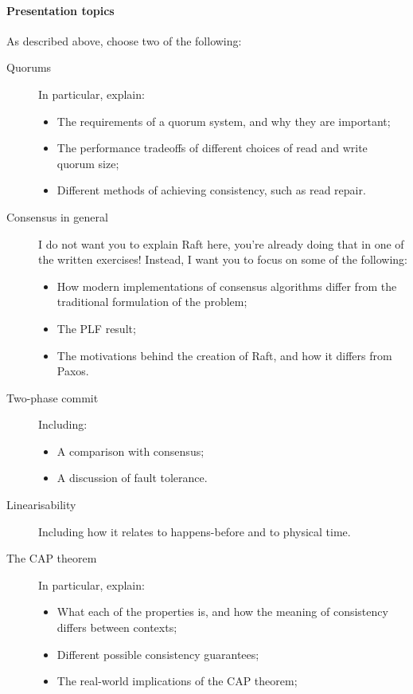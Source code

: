 \documentclass[12pt,a4paper,oneside,openright]{report}
\newcommand{\question}[2]{\paragraph{#1} #2}
\begin{document}
\question{Presentation topics}{As described above, choose two of the
  following:
  \begin{description}
  \item[Quorums] In particular, explain:
    \begin{itemize}
    \item The requirements of a quorum system, and why they are
      important;
    \item The performance tradeoffs of different choices of read and
      write quorum size;
    \item Different methods of achieving consistency, such as read
      repair.
    \end{itemize}
  \item[Consensus in general] I do not want you to explain Raft here,
    you're already doing that in one of the written exercises!
    Instead, I want you to focus on some of the following:
    \begin{itemize}
    \item How modern implementations of consensus algorithms differ
      from the traditional formulation of the problem;
    \item The PLF result;
    \item The motivations behind the creation of Raft, and how it
      differs from Paxos.
    \end{itemize}
  \item[Two-phase commit] Including:
    \begin{itemize}
    \item A comparison with consensus;
    \item A discussion of fault tolerance.
    \end{itemize}
  \item[Linearisability] Including how it relates to happens-before
    and to physical time.
  \item[The CAP theorem] In particular, explain:
    \begin{itemize}
    \item What each of the properties is, and how the meaning of
      consistency differs between contexts;
    \item Different possible consistency guarantees;
    \item The real-world implications of the CAP theorem;

\end{itemize}
\end{description}}
\end{document}

